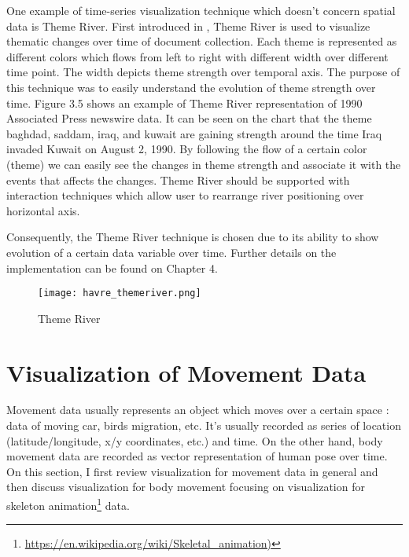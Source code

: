 One example of time-series visualization technique which doesn't concern spatial data is Theme River. First introduced in \cite{havre}, Theme River is used to visualize thematic changes over time of document collection. Each theme is represented as different colors which flows from left to right with different width over different time point. The width depicts theme strength over temporal axis. The purpose of this technique was to easily understand the evolution of theme strength over time. Figure 3.5 shows an example of Theme River representation of 1990 Associated Press newswire data. It can be seen on the chart that the theme baghdad, saddam, iraq, and kuwait are gaining strength  around the time Iraq invaded Kuwait on August 2, 1990. By following the flow of a certain color (theme) we can easily see the changes in theme strength and associate it with the events that affects the changes. Theme River should be supported with interaction techniques which allow user to rearrange river positioning over horizontal axis. 

Consequently, the Theme River technique is chosen due to its ability to show evolution of a certain data variable over time. Further details on the implementation can be found on Chapter 4.

\begin{figure}
\centering
\texttt{[image: havre\_themeriver.png]}
\caption{Theme River}
\end{figure}


\section{Visualization of Movement Data}

Movement data usually represents an object which moves over a certain space \cite{adrienko_book}: data of moving car, birds migration, etc. It's usually recorded as series of location (latitude/longitude, x/y coordinates, etc.) and time. On the other hand, body movement data are recorded as vector representation of human pose \cite{bernard2013} over time. On this section, I first review visualization for movement data in general and then discuss visualization for body movement focusing on visualization for skeleton animation\footnote{\url{https://en.wikipedia.org/wiki/Skeletal_animation)}} data.

